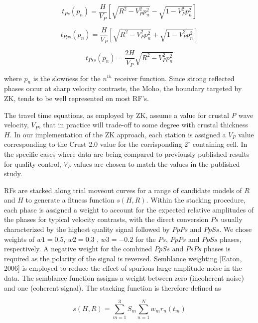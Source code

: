 \documentclass[draft, 12pt]{article}
\begin{document}
\begin{equation} \label{eq:tps}
t_{Ps}(p_n) = \frac{H}{V_P} \left[ \sqrt{ R^2 - V_P^2p_n^2} - \sqrt{1 - V_P^2p_n^2} \right]
\end{equation}

\begin{equation}
t_{Pps}(p_n) = \frac{H}{V_P} \left[ \sqrt{ R^2 - V_P^2p_n^2} + \sqrt{1 - V_P^2p_n^2} \right]
\end{equation}

\begin{equation}
t_{Pss}(p_n)= \frac{2H}{V_P} \sqrt{ R^2 - V_P^2p_n^2}
\end{equation}

\noindent where $p_n$ is the slowness for the $n^{th}$ receiver function. Since strong reflected phases occur at sharp velocity contrasts, the Moho, the boundary targeted by ZK, tends to be well represented on most RF's.

The travel time equations, as employed by ZK, assume a value for crustal {\it P} wave velocity, $V_P$, that in practice will trade-off to some degree with crustal thickness $H$. In our implementation of the ZK approach, each station is assigned a $V_P$ value corresponding to the Crust 2.0 value for the corrisponding $2^\circ$ containing cell. In the specific cases where data are being compared to previously published results for quality control, $V_P$  values are chosen to match the values in the published study.

RFs are stacked along trial moveout curves for a range of candidate models of $R$ and $H$ to generate a fitness function $s(H,R)$.  Within the stacking procedure, each phase is assigned a weight to account for the expected relative amplitudes of the phases for typical velocity contrasts, with the direct conversion $Ps$ usually characterized by the highest quality signal followed by $PpPs$ and $PpSs$. We chose weights of $w1 = 0.5$, $w2 = 0.3$ , $w3 = -0.2$ for the $Ps$, $PpPs$ and $PpSs$ phases, respectively. A negative weight for the combined $PpSs$ and $PsPs$ phases is required as the polarity of the signal is reversed. Semblance weighting [Eaton, 2006] is employed to reduce the effect of spurious large amplitude noise in the data. The semblance function assigns a weight between zero (incoherent noise) and one (coherent signal). The stacking function is therefore defined as

\begin{equation}  \label{eq:stack}
s(H,R) = \sum_{m=1}^{3} S_m \sum_{n=1}^N w_mr_n(t_m)
\end{equation}
\end{document}

